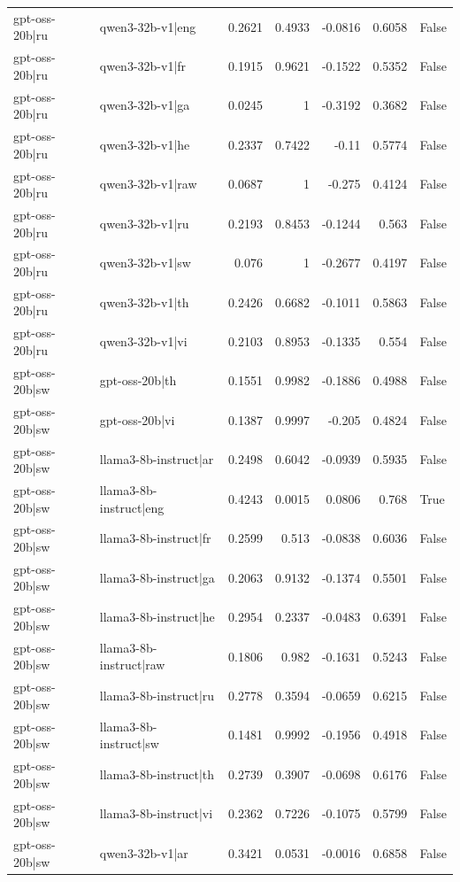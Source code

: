 \begin{table}
\begin{tabular}{l l r r r r l}
gpt-oss-20b|ru & qwen3-32b-v1|eng & 0.2621 & 0.4933 & -0.0816 & 0.6058 & False \\
gpt-oss-20b|ru & qwen3-32b-v1|fr & 0.1915 & 0.9621 & -0.1522 & 0.5352 & False \\
gpt-oss-20b|ru & qwen3-32b-v1|ga & 0.0245 & 1 & -0.3192 & 0.3682 & False \\
gpt-oss-20b|ru & qwen3-32b-v1|he & 0.2337 & 0.7422 & -0.11 & 0.5774 & False \\
gpt-oss-20b|ru & qwen3-32b-v1|raw & 0.0687 & 1 & -0.275 & 0.4124 & False \\
gpt-oss-20b|ru & qwen3-32b-v1|ru & 0.2193 & 0.8453 & -0.1244 & 0.563 & False \\
gpt-oss-20b|ru & qwen3-32b-v1|sw & 0.076 & 1 & -0.2677 & 0.4197 & False \\
gpt-oss-20b|ru & qwen3-32b-v1|th & 0.2426 & 0.6682 & -0.1011 & 0.5863 & False \\
gpt-oss-20b|ru & qwen3-32b-v1|vi & 0.2103 & 0.8953 & -0.1335 & 0.554 & False \\
gpt-oss-20b|sw & gpt-oss-20b|th & 0.1551 & 0.9982 & -0.1886 & 0.4988 & False \\
gpt-oss-20b|sw & gpt-oss-20b|vi & 0.1387 & 0.9997 & -0.205 & 0.4824 & False \\
gpt-oss-20b|sw & llama3-8b-instruct|ar & 0.2498 & 0.6042 & -0.0939 & 0.5935 & False \\
gpt-oss-20b|sw & llama3-8b-instruct|eng & 0.4243 & 0.0015 & 0.0806 & 0.768 & True \\
gpt-oss-20b|sw & llama3-8b-instruct|fr & 0.2599 & 0.513 & -0.0838 & 0.6036 & False \\
gpt-oss-20b|sw & llama3-8b-instruct|ga & 0.2063 & 0.9132 & -0.1374 & 0.5501 & False \\
gpt-oss-20b|sw & llama3-8b-instruct|he & 0.2954 & 0.2337 & -0.0483 & 0.6391 & False \\
gpt-oss-20b|sw & llama3-8b-instruct|raw & 0.1806 & 0.982 & -0.1631 & 0.5243 & False \\
gpt-oss-20b|sw & llama3-8b-instruct|ru & 0.2778 & 0.3594 & -0.0659 & 0.6215 & False \\
gpt-oss-20b|sw & llama3-8b-instruct|sw & 0.1481 & 0.9992 & -0.1956 & 0.4918 & False \\
gpt-oss-20b|sw & llama3-8b-instruct|th & 0.2739 & 0.3907 & -0.0698 & 0.6176 & False \\
gpt-oss-20b|sw & llama3-8b-instruct|vi & 0.2362 & 0.7226 & -0.1075 & 0.5799 & False \\
gpt-oss-20b|sw & qwen3-32b-v1|ar & 0.3421 & 0.0531 & -0.0016 & 0.6858 & False \\

\end{tabular}
\end{table}
